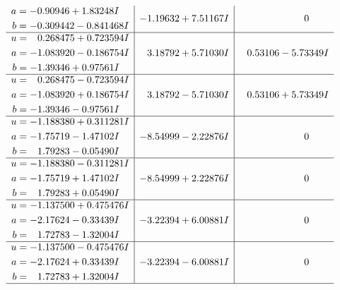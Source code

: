 \documentclass[1p]{elsarticle_modified}
\theoremstyle{definition}
\begin{document}
$$\begin{array}{c|c|c}
\begin{aligned}
a &= -0.90946 + 1.83248 I \\
b &= -0.309442 - 0.841468 I\end{aligned}
 & -1.19632 + 7.51167 I & \phantom{-0.000000 } 0 \\ \hline\begin{aligned}
u &= \phantom{-}0.268475 + 0.723594 I \\
a &= -1.083920 - 0.186754 I \\
b &= -1.39346 + 0.97561 I\end{aligned}
 & \phantom{-}3.18792 + 5.71030 I & \phantom{-}0.53106 - 5.73349 I \\ \hline\begin{aligned}
u &= \phantom{-}0.268475 - 0.723594 I \\
a &= -1.083920 + 0.186754 I \\
b &= -1.39346 - 0.97561 I\end{aligned}
 & \phantom{-}3.18792 - 5.71030 I & \phantom{-}0.53106 + 5.73349 I \\ \hline\begin{aligned}
u &= -1.188380 + 0.311281 I \\
a &= -1.75719 - 1.47102 I \\
b &= \phantom{-}1.79283 - 0.05490 I\end{aligned}
 & -8.54999 - 2.22876 I & \phantom{-0.000000 } 0 \\ \hline\begin{aligned}
u &= -1.188380 - 0.311281 I \\
a &= -1.75719 + 1.47102 I \\
b &= \phantom{-}1.79283 + 0.05490 I\end{aligned}
 & -8.54999 + 2.22876 I & \phantom{-0.000000 } 0 \\ \hline\begin{aligned}
u &= -1.137500 + 0.475476 I \\
a &= -2.17624 - 0.33439 I \\
b &= \phantom{-}1.72783 - 1.32004 I\end{aligned}
 & -3.22394 + 6.00881 I & \phantom{-0.000000 } 0 \\ \hline\begin{aligned}
u &= -1.137500 - 0.475476 I \\
a &= -2.17624 + 0.33439 I \\
b &= \phantom{-}1.72783 + 1.32004 I\end{aligned}
 & -3.22394 - 6.00881 I & \phantom{-0.000000 } 0\\
 \hline 
 \end{array}$$\newpage$$\begin{array}{c|c|c}  

\end{array}$$
\end{document}
